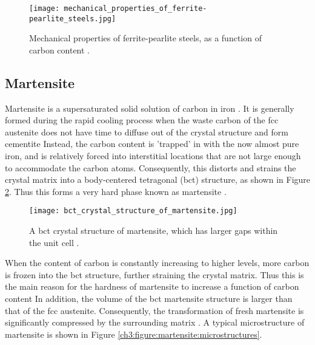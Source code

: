 \begin{figure}[H]
    \centering
    \texttt{[image: mechanical\_properties\_of\_ferrite-pearlite\_steels.jpg]}
    \caption{Mechanical properties of ferrite-pearlite steels, as a function of carbon content \cite{molabe2018determining}. }
    \label{ch3:figure:properties}
\end{figure}

\subsection{Martensite}
Martensite is a supersaturated solid solution of carbon in iron \cite{molabe2018determining}. It is generally formed during the rapid cooling process when the waste carbon of the fcc austenite does not have time to diffuse out of the crystal structure and form cementite \cite{bajaj2020steels} Instead, the carbon content is 'trapped' in with the now almost pure iron, and is relatively forced into interstitial locations that are not large enough to accommodate the carbon atoms. Consequently, this distorts and strains the crystal matrix into a body-centered tetragonal (bct) structure, as shown in Figure \ref{ch3:figure:martensite}. Thus this forms a very hard phase known as martensite \cite{molabe2018determining}.
 
\begin{figure}[H]
    \centering
    \texttt{[image: bct\_crystal\_structure\_of\_martensite.jpg]}
    \caption{A bct crystal structure of martensite, which has larger gaps within the unit cell \cite{bajaj2020steels}.}
    \label{ch3:figure:martensite}
\end{figure}

When the content of carbon is constantly increasing to higher levels, more carbon is frozen into the bct structure, further straining the crystal matrix. Thus this is the main reason for the hardness of martensite to increase a function of carbon content \cite{bajaj2020steels} In addition, the volume of the bct martensite structure is larger than that of the fcc austenite. Consequently, the transformation of fresh martensite is significantly compressed by the surrounding matrix \cite{bajaj2020steels}. A typical microstructure of martensite is shown in Figure \ref{ch3:figure:martensite:microstructures}.

